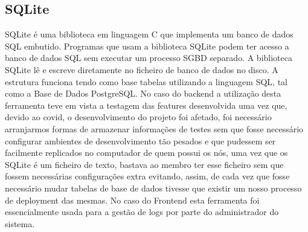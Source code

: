 \subsection{SQLite}
SQLite é uma biblioteca em linguagem C que implementa um banco de dados SQL embutido. Programas que usam a biblioteca SQLite podem ter acesso a banco de dados SQL sem executar um processo SGBD separado. A biblioteca SQLite lê e escreve diretamente no ficheiro de banco de dados no disco.\newline
A estrutura funciona tendo como base tabelas utilizando a linguagem SQL, tal como a Base de Dados PostgreSQL.\newline
No caso do backend a utilização desta ferramenta teve em vista a testagem das features desenvolvida uma vez que, devido ao covid, o desenvolvimento do projeto foi afetado, foi necessário arranjarmos formas de armazenar informações de testes sem que fosse necessário configurar ambientes de desenvolvimento tão pesados e que pudessem ser facilmente replicados no computador de quem possui os nós, uma vez que os SQLite é um ficheiro de texto, bastava ao membro ter esse ficheiro sem que fossem necessárias configurações extra evitando, assim, de cada vez que fosse necessário mudar tabelas de base de dados tivesse que existir um nosso processo de deployment das mesmas.\newline
No caso do Frontend esta ferramenta foi essencialmente usada para a gestão de logs por parte do administrador do sistema.